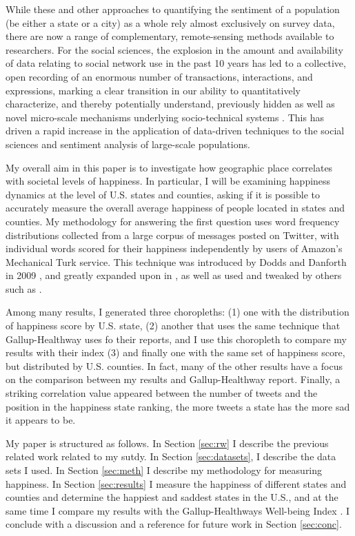 \documentclass{llncs}
\begin{document}
While these and other approaches to quantifying the sentiment of a population (be either a state or a city) as a whole rely almost exclusively on survey data, there are now a range of complementary, remote-sensing methods available to researchers. For the social sciences, the explosion in the amount and availability of data relating to social network use in the past 10 years has led to a collective, open recording of an enormous number of transactions, interactions, and expressions, marking a clear transition in our ability to quantitatively characterize, and thereby potentially understand, previously hidden as well as novel micro-scale mechanisms underlying socio-technical systems \cite{Miller2011}. This has driven a rapid increase in the application of data-driven techniques to the social sciences and sentiment analysis of large-scale populations.

My overall aim in this paper is to investigate how geographic place correlates with societal levels of happiness. In particular, I will be examining happiness dynamics at the level of U.S. states and counties, asking if it is possible to accurately measure the overall average happiness of people located in states and counties. My methodology for answering the first question uses word frequency distributions collected from a large corpus of messages posted on Twitter, with individual words scored for their happiness independently by users of Amazon’s Mechanical Turk service. This technique was introduced by Dodds and Danforth in 2009 \cite{Dodds2009}, and greatly expanded upon in \cite{Dodds2011}, as well as used and tweaked by others such as \cite{Mitchell2013}.

Among many results, I generated three choropleths: (1) one with the distribution of happiness score by U.S. state, (2) another that uses the same technique that Gallup-Healthway uses fo their reports, and I use this choropleth to compare my results with their index (3) and finally one with the same set of happiness score, but distributed by U.S. counties. In fact, many of the other results have a focus on the comparison between my results and Gallup-Healthway report. Finally, a striking correlation value appeared between the number of tweets and the position in the happiness state ranking, the more tweets a state has the more sad it appears to be.

My paper is structured as follows. In Section \ref{sec:rw} I describe the previous related work related to my sutdy. In Section \ref{sec:datasets}, I describe the data sets I used. In Section \ref{sec:meth} I describe my methodology for measuring happiness. In Section \ref{sec:results} I measure the happiness of different states and counties and determine the happiest and saddest states in the U.S., and at the same time I compare my results with the Gallup-Healthways Well-being Index \cite{GallupHealthway2013}. I conclude with a discussion and a reference for future work in Section \ref{sec:conc}.
\end{document}
